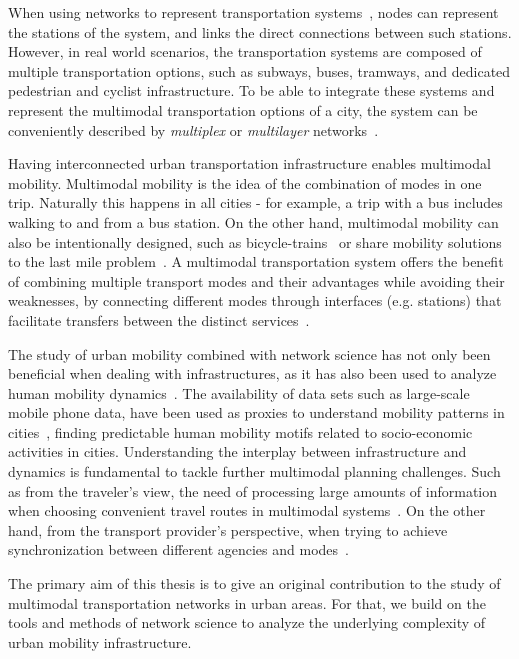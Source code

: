 When using networks to represent transportation systems~\cite{lin2013complex}, nodes can represent the stations of the system, and links the direct connections between such stations. However, in real world scenarios, the transportation systems are composed of multiple transportation options, such as subways, buses, tramways, and dedicated pedestrian and cyclist infrastructure. To be able to integrate these systems and represent the multimodal transportation options of a city, the system can be conveniently described by \textit{multiplex} or \textit{multilayer} networks~\cite{dedomenico2013mathematical,kivela2014multilayer,boccaletti2014structure,battiston2014structural}.

Having interconnected urban transportation infrastructure enables multimodal mobility. Multimodal mobility is the idea of the combination of modes in one trip. Naturally this happens in all cities - for example, a trip with a bus includes walking to and from a bus station. On the other hand, multimodal mobility can also be intentionally designed, such as bicycle-trains~\cite{geurs2016multi} or share mobility solutions to the last mile problem~\cite{shaheen2016mobility}. A multimodal transportation system offers the benefit of combining multiple transport modes and their advantages while avoiding their weaknesses, by connecting different modes through interfaces (e.g. stations) that facilitate transfers between the distinct services~\cite{vannes2002design}.

The study of urban mobility combined with network science has not only been beneficial when dealing with infrastructures, as it has also been used to analyze human mobility dynamics~\cite{barbosa2018human}. The availability of data sets such as large-scale mobile phone data, have been used as proxies to understand mobility patterns in cities~\cite{gonzalez2008understanding}, finding predictable human mobility motifs related to socio-economic activities in cities. Understanding the interplay between infrastructure and dynamics is fundamental to tackle further multimodal planning challenges. Such as from the traveler's view, the need of processing large amounts of information when choosing convenient travel routes in multimodal systems~\cite{gallotti2016limits}. On the other hand, from the transport provider's perspective, when trying to achieve synchronization between different agencies and modes~\cite{barthelemy2016structure}.

The primary aim of this thesis is to give an original contribution to the study of multimodal transportation networks in urban areas. For that, we build on the tools and methods of network science to analyze the underlying complexity of urban mobility infrastructure.

